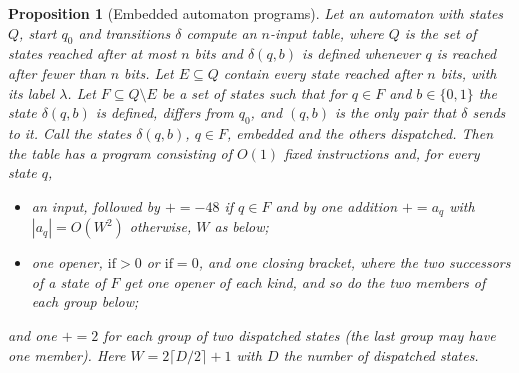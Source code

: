 \documentclass[11pt]{article}
\newtheorem{proposition}[theorem]{Proposition}
\theoremstyle{remark}
\begin{document}
\begin{proposition}[Embedded automaton programs]\label{prop:embprog}
Let an automaton with states $Q$, start $q_0$ and transitions $\delta$ compute an
$n$-input table, where $Q$ is the set of states reached after at most $n$ bits and
$\delta(q,b)$ is defined whenever $q$ is reached after fewer than $n$ bits.  Let
$E\subseteq Q$ contain every state reached after $n$ bits, with its label $\lambda$.
Let $F\subseteq Q\setminus E$ be a set of states such that for $q\in F$ and
$b\in\{0,1\}$ the state $\delta(q,b)$ is defined, differs from $q_0$, and $(q,b)$ is
the only pair that $\delta$ sends to it.  Call the states $\delta(q,b)$, $q\in F$,
\emph{embedded} and the others \emph{dispatched}.  Then the table has a program
consisting of $O(1)$ fixed instructions and, for every state $q$,
\begin{itemize}
\item an input, followed by $\mathord{+}\!=-48$ if $q\in F$ and by one addition
$\mathord{+}\!=a_q$ with $|a_q|=O(W^2)$ otherwise, $W$ as below;
\item one opener, $\text{if}>0$ or $\text{if}=0$, and one closing bracket, where the
two successors of a state of $F$ get one opener of each kind, and so do the two
members of each group below;
\end{itemize}
and one $\mathord{+}\!=2$ for each group of two dispatched states (the last group may
have one member).  Here $W=2\lceil D/2\rceil+1$ with $D$ the number of dispatched states.
\end{proposition}
\end{document}

